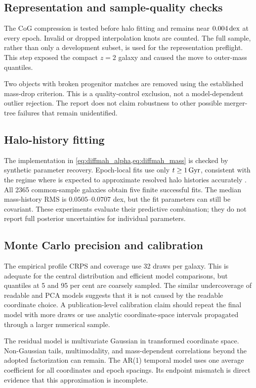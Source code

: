 \subsection{Representation and sample-quality checks}

The CoG compression is tested before halo fitting and remains near $0.004\,\mathrm{dex}$
at every epoch. Invalid or dropped interpolation knots are counted. The full
sample, rather than only a development subset, is used for the representation
preflight. This step exposed the compact $z=2$ galaxy and caused the move to
outer-mass quantiles.

Two objects with broken progenitor matches are removed using the established
mass-drop criterion. This is a quality-control exclusion, not a model-dependent
outlier rejection. The report does not claim robustness to other possible
merger-tree failures that remain unidentified.

\subsection{Halo-history fitting}

The implementation in \cref{eq:diffmah_alpha,eq:diffmah_mass} is checked by
synthetic parameter recovery. Epoch-local fits use only $t\geq1\,\mathrm{Gyr}$, consistent
with the regime where \diffmah{} is expected to approximate resolved halo
histories accurately \citep{Hearin2021}. All 2365 common-sample galaxies obtain
five finite successful fits. The median mass-history RMS is $0.0505$--$0.0707$
dex, but the fit parameters can still be covariant. These experiments evaluate
their predictive combination; they do not report full posterior uncertainties
for individual \diffmah{} parameters.

\subsection{Monte Carlo precision and calibration}

The empirical profile CRPS and coverage use 32 draws per galaxy. This is
adequate for the central distribution and efficient model comparisons, but
quantiles at 5 and 95 per cent are coarsely sampled. The similar undercoverage
of readable and PCA models suggests that it is not caused by the readable
coordinate choice. A publication-level calibration claim should repeat the
final model with more draws or use analytic coordinate-space intervals propagated
through a larger numerical sample.

The residual model is multivariate Gaussian in transformed coordinate space.
Non-Gaussian tails, multimodality, and mass-dependent correlations beyond the
adopted factorization can remain. The AR(1) temporal model uses one average
coefficient for all coordinates and epoch spacings. Its endpoint mismatch is
direct evidence that this approximation is incomplete.

